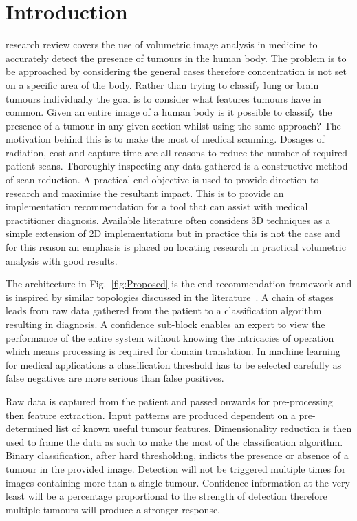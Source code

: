 \documentclass[journal]{IEEEtran}
\begin{document}
\section{Introduction}
 research review covers the use of volumetric image analysis in medicine to accurately detect the presence of tumours in the human body. 
The problem is to be approached by considering the general cases therefore concentration is not set on a specific area of the body.
Rather than trying to classify lung or brain tumours individually the goal is to consider what features tumours have in common.
Given an entire image of a human body is it possible to classify the presence of a tumour in any given section whilst using the same approach?
The motivation behind this is to make the most of medical scanning.
Dosages of radiation, cost and capture time are all reasons to reduce the number of required patient scans.
Thoroughly inspecting any data gathered is a constructive method of scan reduction.
A practical end objective is used to provide direction to research and maximise the resultant impact.
This is to provide an implementation recommendation for a tool that can assist with medical practitioner diagnosis.  
Available literature often considers 3D techniques as a simple extension of 2D implementations but in practice this is not the case and for this reason an emphasis is placed on locating research in practical volumetric analysis with good results.   


The architecture in Fig.~\ref{fig:Proposed} is the end recommendation framework and is inspired by similar topologies discussed in the literature~\cite{ahmed2011efficacy,kumar2011classification,hau07feat,sachdeva2011multiclass,kostis03three}.
A chain of stages leads from raw data gathered from the patient to a classification algorithm resulting in diagnosis.
A confidence sub-block enables an expert to view the performance of the entire system without knowing the intricacies of operation which means processing is required for domain translation.
In machine learning for medical applications a classification threshold has to be selected carefully as false negatives are more serious than false positives.

Raw data is captured from the patient and passed onwards for pre-processing then feature extraction.
Input patterns are produced dependent on a pre-determined list of known useful tumour features. 
Dimensionality reduction is then used to frame the data as such to make the most of the classification algorithm.
Binary classification, after hard thresholding, indicts the presence or absence of a tumour in the provided image.
Detection will not be triggered multiple times for images containing more than a single tumour. 
Confidence information at the very least will be a percentage proportional to the strength of detection therefore multiple tumours will produce a stronger response. 
\end{document}
